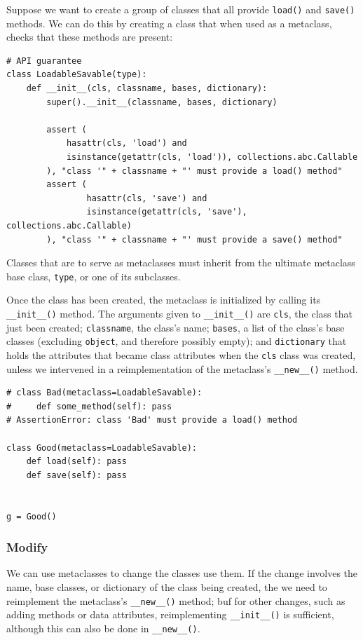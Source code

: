 Suppose we want to create a group of classes that all provide \verb|load()| and \verb|save()| methods.
We can do this by creating a class that when used as a metaclass, checks that these methods are present:

\begin{lstlisting}
# API guarantee
class LoadableSavable(type):
    def __init__(cls, classname, bases, dictionary):
        super().__init__(classname, bases, dictionary)

        assert (
            hasattr(cls, 'load') and
            isinstance(getattr(cls, 'load')), collections.abc.Callable
        ), "class '" + classname + "' must provide a load() method"
        assert (
                hasattr(cls, 'save') and
                isinstance(getattr(cls, 'save'), collections.abc.Callable)
        ), "class '" + classname + "' must provide a save() method"
\end{lstlisting}



Classes that are to serve as metaclasses must inherit from the ultimate metaclass base class, \verb|type|, or one of its subclasses.


Once the class has been created, the metaclass is initialized by calling its \verb|__init__()| method.
The arguments given to \verb|__init__()| are \verb|cls|, the class that just been created;
\verb|classname|, the class's name;
\verb|bases|, a list of the class's base classes (excluding \verb|object|, and therefore possibly empty);
and \verb|dictionary| that holds the attributes that became class attributes when the \verb|cls| class was created,
unless we intervened in a reimplementation of the metaclass's \verb|__new__()| method.



\begin{lstlisting}
# class Bad(metaclass=LoadableSavable):
#     def some_method(self): pass
# AssertionError: class 'Bad' must provide a load() method

class Good(metaclass=LoadableSavable):
    def load(self): pass
    def save(self): pass


g = Good()
\end{lstlisting}



\subsubsection{Modify}

We can use metaclasses to change the classes use them.
If the change involves the name, base classes, or dictionary of the class being created, the we need to reimplement the metaclass's \verb|__new__()| method;
buf for other changes, such as adding methods or data attributes, reimplementing \verb|__init__()| is sufficient, although this can also be done in \verb|__new__()|.





